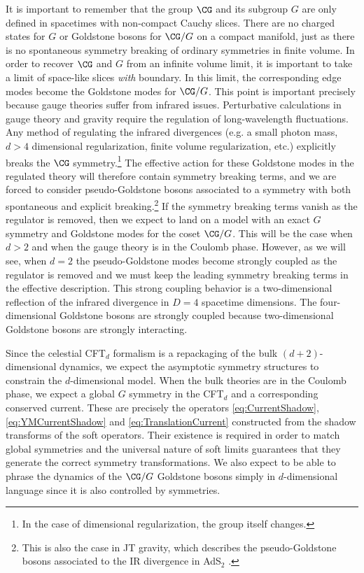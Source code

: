 \documentclass[11pt]{article}
\begin{document}
It is important to remember that the group $\CG$ and its subgroup $G$ are only defined in spacetimes with non-compact Cauchy slices. There are no charged states for $G$ or Goldstone bosons for $\CG/G$ on a compact manifold, just as there is no spontaneous symmetry breaking of ordinary symmetries in finite volume. In order to recover $\CG$ and $G$ from an infinite volume limit, it is important to take a limit of space-like slices \textit{with} boundary. In this limit, the corresponding edge modes become the Goldstone modes for $\CG/G$. This point is important precisely because gauge theories suffer from infrared issues. Perturbative calculations in gauge theory and gravity require the regulation of long-wavelength fluctuations. Any method of regulating the infrared divergences (e.g. a small photon mass, $d>4$ dimensional regularization, finite volume regularization, etc.) explicitly breaks the $\CG$ symmetry.\footnote{In the case of dimensional regularization, the group itself changes.}  The effective action for these Goldstone modes in the regulated theory will therefore contain symmetry breaking terms, and we are forced to consider pseudo-Goldstone bosons associated to a symmetry with both spontaneous and explicit breaking.\footnote{This is also the case in JT gravity, which describes the pseudo-Goldstone bosons associated to the IR divergence in AdS$_2$ \cite{Maldacena:2016upp}.} If the symmetry breaking terms vanish as the regulator is removed, then we expect to land on a model with an exact $G$ symmetry and Goldstone modes for the coset  $\CG/G$. This will be the case when $d>2$ and when the gauge theory is in the Coulomb phase. However, as we will see, when $d=2$ the pseudo-Goldstone modes become strongly coupled as the regulator is removed and we must keep the leading symmetry breaking terms in the effective description. This strong coupling behavior is a two-dimensional reflection of the infrared divergence in $D=4$ spacetime dimensions. The four-dimensional Goldstone bosons are strongly coupled because two-dimensional Goldstone bosons are strongly interacting.


Since the celestial CFT$_d$ formalism is a repackaging of the bulk $(d+2)$-dimensional dynamics, we expect the asymptotic symmetry structures to constrain the $d$-dimensional model. When the bulk theories are in the Coulomb phase, we expect  a global $G$ symmetry in the CFT$_d$ and a corresponding conserved current. These are precisely the operators \eqref{eq:CurrentShadow}, \eqref{eq:YMCurrentShadow} and \eqref{eq:TranslationCurrent} constructed from the shadow transforms of the soft operators. Their existence is required in order to match global symmetries and the universal nature of soft limits guarantees that they generate the correct symmetry transformations. We also expect to be able to phrase the dynamics of the $\CG/G$ Goldstone bosons simply in $d$-dimensional language since it is also controlled by symmetries.
\end{document}
